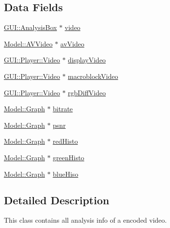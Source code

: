 \subsection*{Data Fields}
\begin{DoxyCompactItemize}
\item 
\hyperlink{classGUI_1_1AnalysisBox}{G\+U\+I\+::\+Analysis\+Box} $\ast$ \hyperlink{classModel_1_1EncodedVideo_a03e0f42a43f7a856dd9881df4024fb4c}{video}
\item 
\hyperlink{classModel_1_1AVVideo}{Model\+::\+A\+V\+Video} $\ast$ \hyperlink{classModel_1_1EncodedVideo_a270efc836b2d2c70aec72106128ff89f}{av\+Video}
\item 
\hyperlink{classGUI_1_1Player_1_1Video}{G\+U\+I\+::\+Player\+::\+Video} $\ast$ \hyperlink{classModel_1_1EncodedVideo_a17f257b55491782940deb4e086adecbb}{display\+Video}
\item 
\hyperlink{classGUI_1_1Player_1_1Video}{G\+U\+I\+::\+Player\+::\+Video} $\ast$ \hyperlink{classModel_1_1EncodedVideo_afb2db9bff47ddb8b0d279068e7b24444}{macroblock\+Video}
\item 
\hyperlink{classGUI_1_1Player_1_1Video}{G\+U\+I\+::\+Player\+::\+Video} $\ast$ \hyperlink{classModel_1_1EncodedVideo_a0a3659e25658447f14c6c00399888369}{rgb\+Diff\+Video}
\item 
\hyperlink{classModel_1_1Graph}{Model\+::\+Graph} $\ast$ \hyperlink{classModel_1_1EncodedVideo_aec2e020f785ceb00064fb8033826603e}{bitrate}
\item 
\hyperlink{classModel_1_1Graph}{Model\+::\+Graph} $\ast$ \hyperlink{classModel_1_1EncodedVideo_a9bac82e3934ef7816be95e35cd18c852}{psnr}
\item 
\hyperlink{classModel_1_1Graph}{Model\+::\+Graph} $\ast$ \hyperlink{classModel_1_1EncodedVideo_a687c8a2518054613e946c48f33520458}{red\+Histo}
\item 
\hyperlink{classModel_1_1Graph}{Model\+::\+Graph} $\ast$ \hyperlink{classModel_1_1EncodedVideo_af09ff3f1ad12186cc33f3ab4cb146cdb}{green\+Histo}
\item 
\hyperlink{classModel_1_1Graph}{Model\+::\+Graph} $\ast$ \hyperlink{classModel_1_1EncodedVideo_a53ce36c444026a777d53d7c2d872b059}{blue\+Hiso}
\end{DoxyCompactItemize}


\subsection{Detailed Description}
This class contains all analysis info of a encoded video. 

